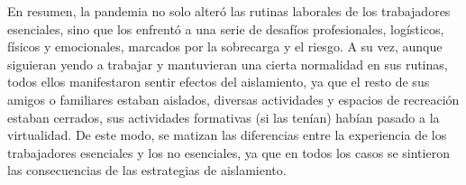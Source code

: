 \begin{refsection}
En resumen, la pandemia no solo alteró las rutinas laborales de los trabajadores esenciales, sino que los enfrentó a una serie de desafíos profesionales, logísticos, físicos y emocionales, marcados por la sobrecarga y el riesgo. A su vez, aunque siguieran yendo a trabajar y mantuvieran una cierta normalidad en sus rutinas, todos ellos manifestaron sentir efectos del aislamiento, ya que el resto de sus amigos o familiares estaban aislados, diversas actividades y espacios de recreación estaban cerrados, sus actividades formativas (si las tenían) habían pasado a la virtualidad. De este modo, se matizan las diferencias entre la experiencia de los trabajadores esenciales y los no esenciales, ya que en todos los casos se sintieron las consecuencias de las estrategias de aislamiento.


\section*{\refname}
\printbibliography[heading=none]
\end{refsection}

